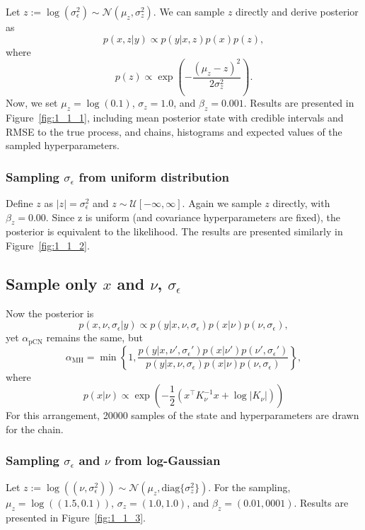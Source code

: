\documentclass[times, a4paper, 12pt, onecolumn, oneside]{article}
\begin{document}
Let $z := \log(\sigma_\epsilon^2) \sim \mathcal{N}(\mu_z, \sigma_z^2)$. We can sample $z$ directly and derive posterior as
$$
p(x, z | y) \propto p(y | x, z) p(x) p(z),
$$
where
$$
p(z) \propto \exp\left(-\frac{(\mu_z - z)^2}{2\sigma_z^2}\right).
$$
Now, we set $\mu_z = \log(0.1)$, $\sigma_z = 1.0$, and $\beta_z = 0.001$.
Results are presented in Figure~\ref{fig:1_1_1}, including mean posterior state with credible intervals and RMSE to the true process, and chains, histograms and expected values of the sampled hyperparameters.

\subsubsection{Sampling $\sigma_\epsilon$ from uniform distribution}

Define $z$ as $|z| = \sigma_\epsilon^2$ and $z \sim \mathcal{U}\left[-\infty, \infty\right]$. Again we sample $z$ directly, with $\beta_z = 0.00$. Since z is uniform (and covariance hyperparameters are fixed), the posterior is equivalent to the likelihood.
The results are presented similarly in Figure~\ref{fig:1_1_2}.

\subsection{Sample only $x$ and $\nu$, $\sigma_\epsilon$}

Now the posterior is
$$
p(x, \nu, \sigma_\epsilon | y) \propto p(y | x, \nu, \sigma_\epsilon) p(x | \nu) p(\nu, \sigma_\epsilon),
$$
yet $\alpha_\text{pCN}$ remains the same, but
$$
    \alpha_\text{MH} = \min\left\{1, \frac{p(y | x, \nu', \sigma_\epsilon') p(x | \nu') p(\nu', \sigma_\epsilon')}{p(y | x, \nu, \sigma_\epsilon) p(x | \nu) p(\nu, \sigma_\epsilon)} \right\},
$$
where
$$
p(x | \nu) \propto \exp\left(-\frac{1}{2} (x^\intercal K_\nu^{-1} x + \log |K_{\nu}|)\right)
$$
For this arrangement, 20000 samples of the state and hyperparameters are drawn for the chain.

\subsubsection{Sampling $\sigma_\epsilon$ and $\nu$ from log-Gaussian}

Let $z := \log((\nu, \sigma_\epsilon^2)) \sim \mathcal{N}(\mu_z, \mathrm{diag}\{\sigma_z^2\})$.
For the sampling, $\mu_z = \log((1.5, 0.1))$, $\sigma_z = (1.0, 1.0)$, and $\beta_z = (0.01, 0001)$.
Results are presented in Figure~\ref{fig:1_1_3}.
\end{document}
